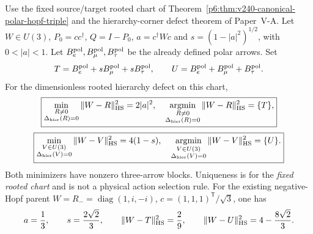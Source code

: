\documentclass[12pt,a4paper]{article}
\begin{document}
\begin{theorem}
\label{p6:thm:v3024-rooted-hopf-nearest-source}
Use the fixed source/target rooted chart of
Theorem~\ref{p6:thm:v240-canonical-polar-hopf-triple} and
the hierarchy-corner defect theorem of Paper~V-A.
Let \(W\in U(3)\), \(P_0=cc^\dagger\),
\(Q=I-P_0\), \(a=c^\dagger Wc\) and
\(s=(1-|a|^2)^{1/2}\), with \(0<|a|<1\).
Let \(B_e^{\rm pol},B_\mu^{\rm pol},B_\tau^{\rm pol}\) be the
already defined polar arrows.  Set
\[
 T=B_e^{\rm pol}+sB_\mu^{\rm pol}+sB_\tau^{\rm pol},
 \qquad U=B_e^{\rm pol}+B_\mu^{\rm pol}+B_\tau^{\rm pol}.
\]
For the dimensionless rooted hierarchy defect on this chart,
\[
 \boxed{\min_{\substack{R\ne0\\\Delta_{\rm hier}(R)=0}}
 \|W-R\|_{\rm HS}^2=2|a|^2,\quad
 \operatorname*{argmin}_{\substack{R\ne0\\\Delta_{\rm hier}(R)=0}}
 \|W-R\|_{\rm HS}^2=\{T\},}
\]
\[
 \boxed{\min_{\substack{V\in U(3)\\\Delta_{\rm hier}(V)=0}}
 \|W-V\|_{\rm HS}^2=4(1-s),\quad
 \operatorname*{argmin}_{\substack{V\in U(3)\\\Delta_{\rm hier}(V)=0}}
 \|W-V\|_{\rm HS}^2=\{U\}.}
\]
Both minimizers have nonzero three-arrow blocks.  Uniqueness is for the
\emph{fixed rooted chart} and is not a physical action selection rule.
For the existing negative-Hopf parent
\(W=R_-=\operatorname{diag}(1,i,-i)\),
\(c=(1,1,1)^\mathsf T/\sqrt3\), one has
\[
 a=\frac13,\qquad s=\frac{2\sqrt2}{3},\qquad
 \|W-T\|_{\rm HS}^2=\frac29,\qquad
 \|W-U\|_{\rm HS}^2=4-\frac{8\sqrt2}{3}.
\]
\end{theorem}
\end{document}
